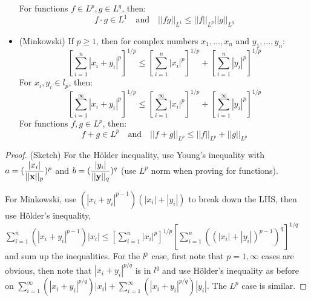 \documentclass{article}
\begin{document}
\begin{cor}
\begin{itemize}
                    For functions $f \in L^p, g \in L^q$, then:  
                        \begin{equation}
                            f \cdot g \in L^1 \quad \text{and} \quad ||fg||_{L^1} \leq ||f||_{L^p} ||g||_{L^q}
                        \end{equation}
        \item (Minkowski) If $p \geq 1$, then for complex numbers  $x_1, \dots, x_n$ and $y_1,\dots, y_n$:
                        \begin{equation}
                            \left[\sum_{i=1}^n |x_i+y_i|^p \right]^{1/p} \leq \left[\sum_{i=1}^n |x_i|^p\right]^{1/p} + \left[\sum_{i=1}^n |y_i|^p\right]^{1/p}
                        \end{equation}
                    For ${x_i}, {y_i} \in l_p$, then:
                    \begin{equation}
                        \left[\sum_{i=1}^{\infty} |x_i+y_i|^p \right]^{1/p} \leq \left[\sum_{i=1}^{\infty} |x_i|^p\right]^{1/p} + \left[\sum_{i=1}^{\infty} |y_i|^p\right]^{1/p}
                    \end{equation}
                    For functions $f, g \in L^p$, then:
                        \begin{equation}
                            f+g \in L^p \quad \text{and} \quad ||f+g||_{L^p} \leq ||f||_{L^p} + ||g||_{L^p}
                        \end{equation}
    \end{itemize}
    \begin{proof}
        (Sketch) For the Hölder inequality, use Young's inequality with $a=(\dfrac{|x_i|}{||\mathbf{x}||_p})^p$ and 
        $b=(\dfrac{|y_i|}{||\mathbf{y}||_q})^q$ (use $L^p$ norm when proving for functions).  
        
        For Minkowski, use $(|x_i+y_i|^{p-1})(|x_i|+|y_i|)$ to break down the LHS, then use Hölder's inequality,
        $\sum_{i=1}^n (|x_i+y_i|^{p-1})|x_i| \leq \left[ \sum_{i=1}^n |x_i|^p\right]^{1/p}
        \left[ \sum_{i=1}^n ((|x_i|+|y_i|)^{p-1})^q\right]^{1/q}$ and sum up the inequalities.   
        For the $l^p$ case, first note that $p=1,\infty$ cases are obvious, then note
        that $|x_i+y_i|^{p/q}$ is in $l^q$ and use Hölder's inequality as before on 
        $\sum_{i=1}^{\infty} (|x_i+y_i|^{p/q})|x_i|+\sum_{i=1}^{\infty} (|x_i+y_i|^{p/q})|y_i|$.  
        The $L^p$ case is similar.  
    \end{proof}
\end{cor}
\end{document}
